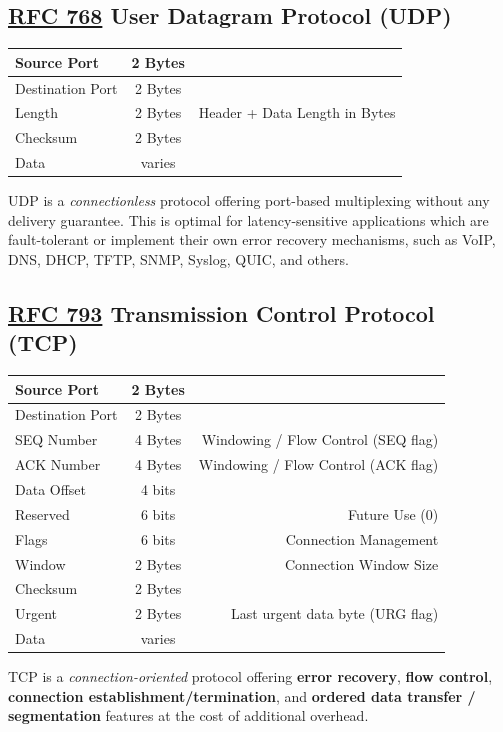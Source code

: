 \documentclass[12pt]{article}
\newcommand{\RFC}[1]{\href{https://datatracker.ietf.org/doc/html/rfc#1}{RFC #1}}
\begin{document}
	\subsection[RFC 768 UDP]{\RFC{768} User Datagram Protocol (UDP) \label{subsec:UDP}}
	\begin{table}[H]
	\centering
	\begin{tabular}{| l | c | r |}
	\hline
	Source Port		& 2 Bytes	& \Cref{tab:L4 PORTS KNOWN,tab:L4 PORTS REGISTERED}\\\hline
	Destination Port	& 2 Bytes	& \Cref{tab:L4 PORTS KNOWN,tab:L4 PORTS REGISTERED}\\\hline
	Length		& 2 Bytes	& Header + Data Length in Bytes\\\hline
	Checksum		& 2 Bytes	&\\\hline
	Data			& varies	&\\\hline
	\end{tabular}\end{table}
	UDP is a \textit{connectionless} protocol offering port-based multiplexing without any delivery guarantee. This is optimal for latency-sensitive applications which are fault-tolerant or implement their own error recovery mechanisms, such as VoIP, DNS, DHCP, TFTP, SNMP, Syslog, QUIC, and others.


	\subsection[RFC 793 TCP]{\RFC{793} Transmission Control Protocol (TCP) \label{subsec:TCP}}
	\begin{table}[H]
	\centering
	\begin{tabular}{| l | c | r |}
	\hline
	Source Port		& 2 Bytes	& \Cref{tab:L4 PORTS KNOWN,tab:L4 PORTS REGISTERED}\\\hline
	Destination Port	& 2 Bytes	& \Cref{tab:L4 PORTS KNOWN,tab:L4 PORTS REGISTERED}\\\hline
	SEQ Number	& 4 Bytes	& Windowing / Flow Control (SEQ flag)\\\hline
	ACK Number	& 4 Bytes	& Windowing / Flow Control (ACK flag)\\\hline
	Data Offset		& 4 bits	&\\\hline
	Reserved		& 6 bits	& Future Use (0)\\\hline
	Flags			& 6 bits	& Connection Management\\\hline
	Window		& 2 Bytes	& Connection Window Size\\\hline
	Checksum		& 2 Bytes	&\\\hline
	Urgent		& 2 Bytes	& Last urgent data byte (URG flag)\\\hline
	Data			& varies	&\\\hline
	\end{tabular}\end{table}
	TCP is a \textit{connection-oriented} protocol offering \textbf{error recovery}, \textbf{flow control}, \textbf{connection establishment/termination}, and \textbf{ordered data transfer / segmentation} features at the cost of additional overhead.
\end{document}
